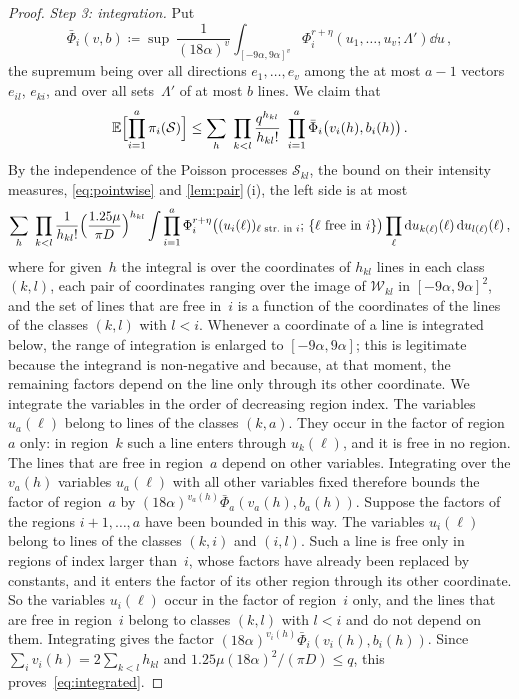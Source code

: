 \documentclass[11pt,letterpaper]{article}
\newcommand{\cS}{\mathcal S}
\newcommand{\cW}{\mathcal W}
\begin{document}
\begin{proof}
\emph{Step 3: integration.} Put
\begin{equation*}
  \bar\Phi_i(v,b)\coloneqq\sup\ \frac1{(18\alpha)^{v}}\int_{[-9\alpha,9\alpha]^{v}}\Phi_i^{r+\eta}(u_1,\dots,u_v;\Lambda')\dd u\,,
\end{equation*}
the supremum being over all directions $e_1,\dots,e_v$ among the at most $a-1$ vectors $e_{il}$, $e_{ki}$, and over all sets~$\Lambda'$ of at most $b$ lines. We claim that
\begin{equation}
\label{eq:integrated}
  \E\Bigl[\prod_{i=1}^a\pi_i(\cS)\Bigr]\le\sum_h\ \prod_{k<l}\frac{q^{h_{kl}}}{h_{kl}!}\ \prod_{i=1}^a\bar\Phi_i\bigl(v_i(h),b_i(h)\bigr)\,.
\end{equation}
By the independence of the Poisson processes $\cS_{kl}$, the bound on their intensity measures, \eqref{eq:pointwise} and \cref{lem:pair}\,(i), the left side is at most
\begin{equation*}
  \sum_h\ \prod_{k<l}\frac{1}{h_{kl}!}\Bigl(\frac{1.25\mu}{\pi D}\Bigr)^{h_{kl}}\int\prod_{i=1}^a\Phi_i^{r+\eta}\bigl((u_i(\ell))_{\ell\text{ str.\ in }i};\,\{\ell\text{ free in }i\}\bigr)\prod_{\ell}\d u_{k(\ell)}(\ell)\,\d u_{l(\ell)}(\ell)\,,
\end{equation*}
where for given~$h$ the integral is over the coordinates of $h_{kl}$ lines in each class $(k,l)$, each pair of coordinates ranging over the image of $\cW_{kl}$ in $[-9\alpha,9\alpha]^2$, and the set of lines that are free in~$i$ is a function of the coordinates of the lines of the classes $(k,l)$ with $l<i$. Whenever a coordinate of a line is integrated below, the range of integration is enlarged to $[-9\alpha,9\alpha]$; this is legitimate because the integrand is non-negative and because, at that moment, the remaining factors depend on the line only through its other coordinate. We integrate the variables in the order of decreasing region index. The variables $u_a(\ell)$ belong to lines of the classes $(k,a)$. They occur in the factor of region~$a$ only: in region~$k$ such a line enters through $u_k(\ell)$, and it is free in no region. The lines that are free in region~$a$ depend on other variables. Integrating over the $v_a(h)$ variables $u_a(\ell)$ with all other variables fixed therefore bounds the factor of region~$a$ by $(18\alpha)^{v_a(h)}\bar\Phi_a(v_a(h),b_a(h))$. Suppose the factors of the regions $i+1,\dots,a$ have been bounded in this way. The variables $u_i(\ell)$ belong to lines of the classes $(k,i)$ and $(i,l)$. Such a line is free only in regions of index larger than~$i$, whose factors have already been replaced by constants, and it enters the factor of its other region through its other coordinate. So the variables $u_i(\ell)$ occur in the factor of region~$i$ only, and the lines that are free in region~$i$ belong to classes $(k,l)$ with $l<i$ and do not depend on them. Integrating gives the factor $(18\alpha)^{v_i(h)}\bar\Phi_i(v_i(h),b_i(h))$. Since $\sum_iv_i(h)=2\sum_{k<l}h_{kl}$ and $1.25\mu(18\alpha)^2/(\pi D)\le q$, this proves~\eqref{eq:integrated}.


\end{proof}
\end{document}
